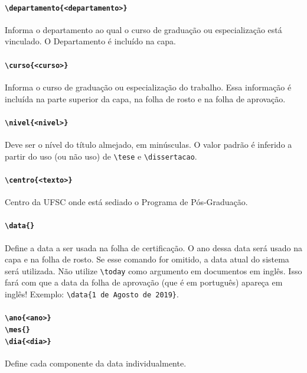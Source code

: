 \documentclass[embeddedlogo]{ufsc-thesis-rn46-2019}
\newcommand{\lacmd}[1]{\texttt{\textbackslash{}#1}}
\begin{document}
\paragraph*{\lacmd{departamento\{<departamento>\}}} Informa o departamento ao
qual o curso de graduação ou especialização está vinculado. O Departamento é
incluído na capa.

\paragraph*{\lacmd{curso\{<curso>\}}} Informa o curso de graduação
ou especialização do trabalho. Essa informação é incluída na parte superior da
capa, na folha de rosto e na folha de aprovação.

\paragraph*{\lacmd{nivel\{<nivel>\}}} Deve ser o nível do título almejado, em
minúsculas. O valor padrão é inferido a partir do uso (ou não uso) de
\lacmd{tese} e \lacmd{dissertacao}.

\paragraph*{\lacmd{centro\{<texto>\}}} Centro da UFSC onde está sediado o
Programa de Pós-Graduação.

\paragraph*{\lacmd{data\{<data por extenso>\}}} Define a data a ser usada na
folha de certificação. O ano dessa data será usado na capa e na folha de
rosto. Se esse comando for omitido, a data atual do sistema será utilizada. Não
utilize \lacmd{today} como argumento em documentos em inglês. Isso fará com que
a data da folha de aprovação (que é em português) apareça em inglês! Exemplo:
\lacmd{data\{1 de Agosto de 2019\}}.

\paragraph*{\lacmd{ano\{<ano>\}} \\
            \lacmd{mes\{<nome do mes>\}} \\
            \lacmd{dia\{<dia>\}}}
Define cada componente da data individualmente.
\end{document}
